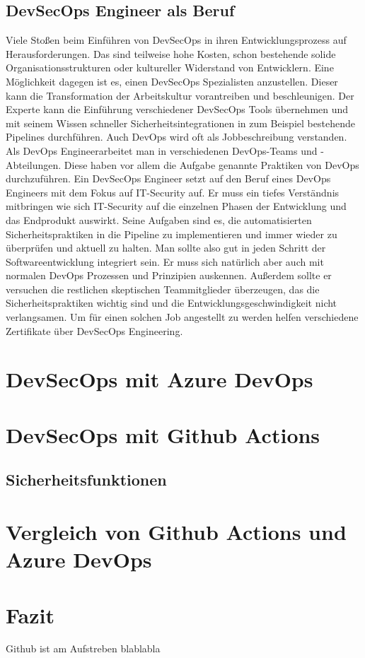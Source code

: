 \section{DevSecOps Engineer als Beruf}
Viele Stoßen beim Einführen von DevSecOps in ihren Entwicklungsprozess auf Herausforderungen. Das sind teilweise hohe Kosten, schon bestehende solide Organisationsstrukturen oder kultureller Widerstand von Entwicklern. Eine Möglichkeit dagegen ist es, einen DevSecOps Spezialisten anzustellen. Dieser kann die Transformation der Arbeitskultur vorantreiben und beschleunigen. Der Experte kann die Einführung verschiedener DevSecOps Tools übernehmen und mit seinem Wissen schneller Sicherheitsintegrationen in zum Beispiel bestehende Pipelines durchführen. \cite{grey}
Auch DevOps wird oft als Jobbeschreibung verstanden. Als \glqq DevOps Engineer\grqq arbeitet man in verschiedenen DevOps-Teams und -Abteilungen. Diese haben vor allem die Aufgabe genannte Praktiken von DevOps durchzuführen. \cite{dev-ops}
Ein DevSecOps Engineer setzt auf den Beruf eines DevOps Engineers mit dem Fokus auf IT-Security auf. Er muss ein tiefes Verständnis mitbringen wie sich IT-Security auf die einzelnen Phasen der Entwicklung und das Endprodukt auswirkt. Seine Aufgaben sind es, die automatisierten Sicherheitspraktiken in die Pipeline zu implementieren und immer wieder zu überprüfen und aktuell zu halten. Man sollte also gut in jeden Schritt der Softwareentwicklung integriert sein. Er muss sich natürlich aber auch mit normalen DevOps Prozessen und Prinzipien auskennen. Außerdem sollte er versuchen die restlichen skeptischen Teammitglieder überzeugen, das die Sicherheitspraktiken wichtig sind und die Entwicklungsgeschwindigkeit nicht verlangsamen. Um für einen solchen Job angestellt zu werden helfen verschiedene Zertifikate über DevSecOps Engineering. \cite{Cobb2019-lq}


\chapter{DevSecOps mit Azure DevOps}

\chapter{DevSecOps mit Github Actions}

\section{Sicherheitsfunktionen}
\cite{devsecops-github}


\chapter{Vergleich von Github Actions und Azure DevOps}

\chapter{Fazit}
Github ist am Aufstreben blablabla